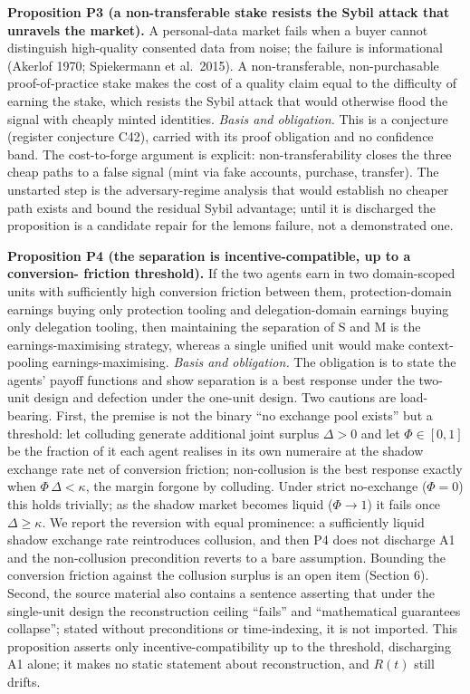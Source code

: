 \documentclass[
  11pt,
]{article}
\begin{document}
\textbf{Proposition P3 (a non-transferable stake resists the Sybil
attack that unravels the market).} A personal-data market fails when a
buyer cannot distinguish high-quality consented data from noise; the
failure is informational (Akerlof 1970; Spiekermann et al.~2015). A
non-transferable, non-purchasable proof-of-practice stake makes the cost
of a quality claim equal to the difficulty of earning the stake, which
resists the Sybil attack that would otherwise flood the signal with
cheaply minted identities. \emph{Basis and obligation.} This is a
conjecture (register conjecture C42), carried with its proof obligation
and no confidence band. The cost-to-forge argument is explicit:
non-transferability closes the three cheap paths to a false signal (mint
via fake accounts, purchase, transfer). The unstarted step is the
adversary-regime analysis that would establish no cheaper path exists
and bound the residual Sybil advantage; until it is discharged the
proposition is a candidate repair for the lemons failure, not a
demonstrated one.

\textbf{Proposition P4 (the separation is incentive-compatible, up to a
conversion- friction threshold).} If the two agents earn in two
domain-scoped units with sufficiently high conversion friction between
them, protection-domain earnings buying only protection tooling and
delegation-domain earnings buying only delegation tooling, then
maintaining the separation of S and M is the earnings-maximising
strategy, whereas a single unified unit would make context-pooling
earnings-maximising. \emph{Basis and obligation.} The obligation is to
state the agents' payoff functions and show separation is a best
response under the two-unit design and defection under the one-unit
design. Two cautions are load-bearing. First, the premise is not the
binary ``no exchange pool exists'' but a threshold: let colluding
generate additional joint surplus \(\Delta > 0\) and let
\(\Phi \in [0,1]\) be the fraction of it each agent realises in its own
numeraire at the shadow exchange rate net of conversion friction;
non-collusion is the best response exactly when \(\Phi\,\Delta
< \kappa\), the margin forgone by colluding. Under strict no-exchange
(\(\Phi = 0\)) this holds trivially; as the shadow market becomes liquid
(\(\Phi \to 1\)) it fails once \(\Delta \ge \kappa\). We report the
reversion with equal prominence: a sufficiently liquid shadow exchange
rate reintroduces collusion, and then P4 does not discharge A1 and the
non-collusion precondition reverts to a bare assumption. Bounding the
conversion friction against the collusion surplus is an open item
(Section 6). Second, the source material also contains a sentence
asserting that under the single-unit design the reconstruction ceiling
``fails'' and ``mathematical guarantees collapse''; stated without
preconditions or time-indexing, it is not imported. This proposition
asserts only incentive-compatibility up to the threshold, discharging A1
alone; it makes no static statement about reconstruction, and \(R(t)\)
still drifts.
\end{document}
